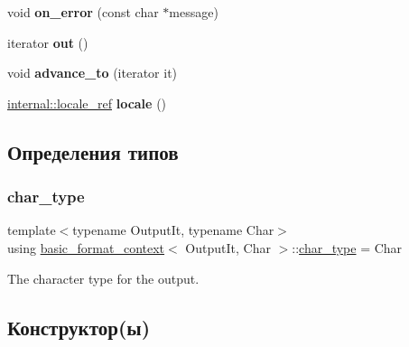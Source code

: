 \begin{DoxyCompactItemize}
void {\bfseries on\+\_\+error} (const char $\ast$message)
\item 
\mbox{\label{classbasic__format__context_ae2a18ce871419974f555bcda290d6b47}} 
iterator {\bfseries out} ()
\item 
\mbox{\label{classbasic__format__context_ab48a9a22c2625693d9c08d341fbb374c}} 
void {\bfseries advance\+\_\+to} (iterator it)
\item 
\mbox{\label{classbasic__format__context_a51fd9ac7b7bec3022348e8e7c1f8db7a}} 
\hyperlink{classinternal_1_1locale__ref}{internal\+::locale\+\_\+ref} {\bfseries locale} ()
\end{DoxyCompactItemize}


\subsection{Определения типов}
\mbox{\label{classbasic__format__context_a71fea7d34edb618df612644dfd02a896}} 
\subsubsection{\texorpdfstring{char\+\_\+type}{char\_type}}
{\footnotesize\ttfamily template$<$typename Output\+It, typename Char$>$ \\
using \hyperlink{classbasic__format__context}{basic\+\_\+format\+\_\+context}$<$ Output\+It, Char $>$\+::\hyperlink{classbasic__format__context_a71fea7d34edb618df612644dfd02a896}{char\+\_\+type} =  Char}

The character type for the output. 

\subsection{Конструктор(ы)}
\mbox{\label{classbasic__format__context_a545b2e17dfec6a57d19ff8f957b1b4fc}} 
